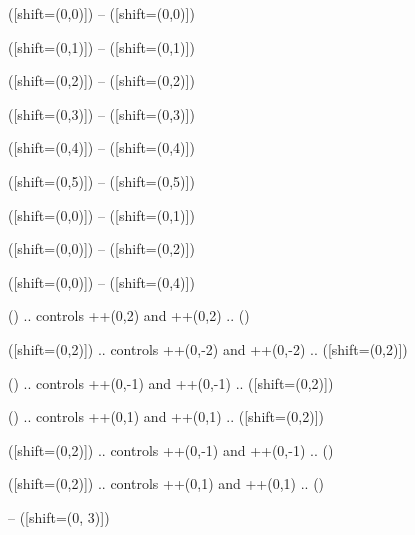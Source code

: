 \def\contourcontourpathcommand#1{\expandafter\def\csname contourcontourpathcommand@#1@\endcsname}


\def\contourmark#1#2#3{%
    \contourcontourpathcommand{#1}{([shift={(0,#2)}]\contourmarkstart) -- ([shift={(0,#3)}]\contourmarkend)}
}

\makeatother


\contourcontourpathcommand{.}{}

\contourmark{0}{0}{0}
\contourmark{1}{1}{1}
\contourmark{2}{2}{2}
\contourmark{3}{3}{3}
\contourmark{4}{4}{4}
\contourmark{5}{5}{5}
\contourmark{+}{0}{1}
\contourmark{,}{0}{2}
\contourmark{>}{0}{4}

\contourcontourpathcommand{!}{
    (\contourmarkstart) .. controls ++(0,2) and ++(0,2) .. (\contourmarkend)
}

\contourcontourpathcommand{@}{
    ([shift={(0,2)}]\contourmarkstart) .. controls ++(0,-2) and ++(0,-2) .. ([shift={(0,2)}]\contourmarkend)
}

\contourcontourpathcommand{?}{
    (\contourmarkstart) .. controls ++(0,-1) and ++(0,-1) .. ([shift={(0,2)}]\contourmarkend)
}

\contourcontourpathcommand{:}{
    (\contourmarkstart) .. controls ++(0,1) and ++(0,1) .. ([shift={(0,2)}]\contourmarkend)
}

\contourcontourpathcommand{;}{
    ([shift={(0,2)}]\contourmarkstart) .. controls ++(0,-1) and ++(0,-1) .. (\contourmarkend)
}

\contourcontourpathcommand{^}{
    ([shift={(0,2)}]\contourmarkstart) .. controls ++(0,1) and ++(0,1) .. (\contourmarkend)
}

\contourcontourpathcommand{|}{
    -- ([shift={(0, 3)}]\contourmarkend)
}


